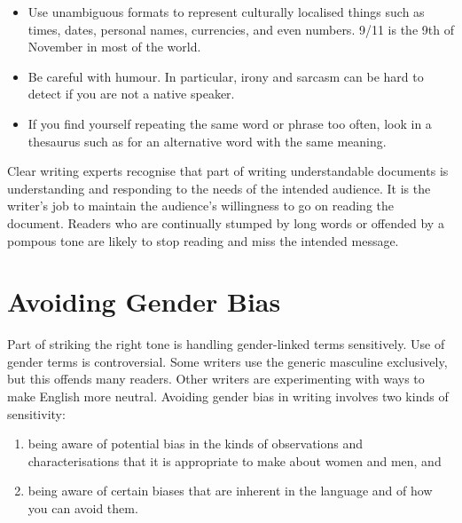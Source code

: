 \begin{itemize}
\item Use unambiguous formats to represent culturally localised things
  such as times, dates, personal names, currencies, and even
  numbers. 9/11 is the 9th of November in most of the world.

\item Be careful with humour. In particular, irony and sarcasm can be
  hard to detect if you are not a native speaker.

\item If you find yourself repeating the same word or phrase too often,
  look in a thesaurus such as \citet{Roget,RogetInt} for an
  alternative word with the same meaning.
\end{itemize}


Clear writing experts recognise that part of writing understandable
documents is understanding and responding to the needs of the intended
audience. It is the writer's job to maintain the audience's
willingness to go on reading the document. Readers who are continually
stumped by long words or offended by a pompous tone are likely to stop
reading and miss the intended message.








\section{Avoiding Gender Bias}
\label{sec:Gender}

Part of striking the right tone is handling gender-linked terms
sensitively. Use of gender terms is controversial. Some writers use
the generic masculine exclusively, but this offends many readers.
Other writers are experimenting with ways to make English more
neutral. Avoiding gender bias in writing involves two kinds of
sensitivity:
\begin{enumerate}
\item being aware of potential bias in the kinds of observations and
  characterisations that it is appropriate to make about women and men,
  and

\item being aware of certain biases that are inherent in the language
  and of how you can avoid them.
\end{enumerate}


